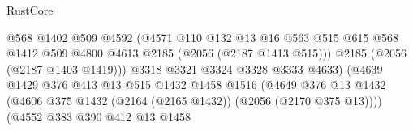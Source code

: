 \begin{lexlean}{RustCore}
\begin{coremodule}
                                            @568
                                            @1402
                                            @509
                                            @4592
                                            (@4571
                                              @110
                                              @132
                                              @13
                                              @16
                                              @563
                                              @515
                                              @615
                                              @568
                                              @1412
                                              @509
                                              @4800
                                              @4613
                                              @2185
                                              (@2056 (@2187 @1413 @515)))
                                            @2185
                                            (@2056 (@2187 @1403 @1419)))
                                          @3318
                                          @3321
                                          @3324
                                          @3328
                                          @3333
                                          @4633)
                                        (@4639
                                          @1429
                                          @376
                                          @413
                                          @13
                                          @515
                                          @1432
                                          @1458
                                          @1516
                                          (@4649
                                            @376
                                            @13
                                            @1432
                                            (@4606
                                              @375
                                              @1432
                                              (@2164 (@2165 @1432))
                                              (@2056 (@2170 @375 @13))))
                                          (@4552
                                            @383
                                            @390
                                            @412
                                            @13
                                            @1458

\end{coremodule}
\end{lexlean}
